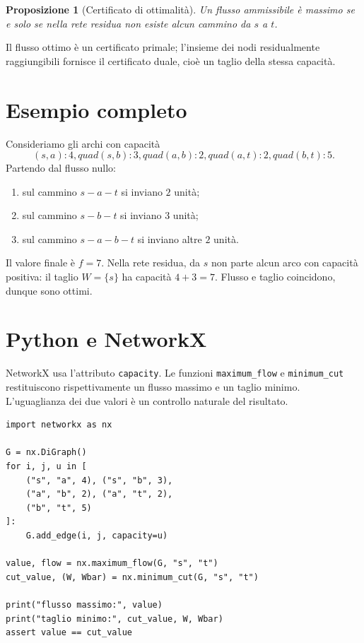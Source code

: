 \documentclass[11pt,a4paper]{article}
\newtheorem{proposition}[definition]{Proposizione}
\begin{document}
\begin{proposition}[Certificato di ottimalità]
Un flusso ammissibile è massimo se e solo se nella rete residua non esiste alcun cammino da $s$ a $t$.
\end{proposition}

Il flusso ottimo è un certificato primale; l'insieme dei nodi residualmente raggiungibili fornisce il certificato duale, cioè un taglio della stessa capacità.

\section{Esempio completo}

Consideriamo gli archi con capacità
\[
(s,a):4,quad (s,b):3,quad (a,b):2,quad (a,t):2,quad (b,t):5.
\]
Partendo dal flusso nullo:
\begin{enumerate}
\item sul cammino $s-a-t$ si inviano $2$ unità;
\item sul cammino $s-b-t$ si inviano $3$ unità;
\item sul cammino $s-a-b-t$ si inviano altre $2$ unità.
\end{enumerate}
Il valore finale è $f=7$. Nella rete residua, da $s$ non parte alcun arco con capacità positiva: il taglio $W=\{s\}$ ha capacità $4+3=7$. Flusso e taglio coincidono, dunque sono ottimi.

\section{Python e NetworkX}

\begin{networkxbox}
NetworkX usa l'attributo \texttt{capacity}. Le funzioni \texttt{maximum\_flow} e \texttt{minimum\_cut} restituiscono rispettivamente un flusso massimo e un taglio minimo. L'uguaglianza dei due valori è un controllo naturale del risultato.
\end{networkxbox}

\begin{lstlisting}[style=python,caption={Massimo flusso e taglio minimo con NetworkX}]
import networkx as nx

G = nx.DiGraph()
for i, j, u in [
    ("s", "a", 4), ("s", "b", 3),
    ("a", "b", 2), ("a", "t", 2),
    ("b", "t", 5)
]:
    G.add_edge(i, j, capacity=u)

value, flow = nx.maximum_flow(G, "s", "t")
cut_value, (W, Wbar) = nx.minimum_cut(G, "s", "t")

print("flusso massimo:", value)
print("taglio minimo:", cut_value, W, Wbar)
assert value == cut_value
\end{lstlisting}
\end{document}
